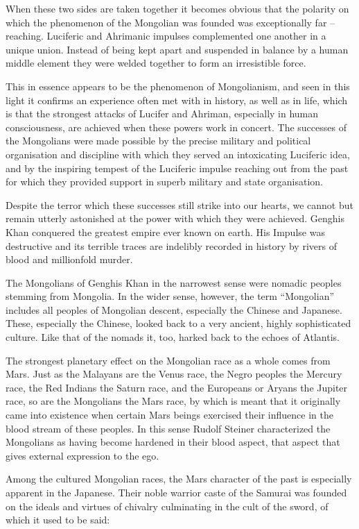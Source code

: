 When these two sides are taken together it becomes obvious that the polarity on which the phenomenon of the Mongolian was founded was exceptionally far -- reaching. Luciferic and Ahrimanic impulses complemented one another in a unique union. Instead of being kept apart and suspended in balance by a human middle element they were welded together to form an irresistible force.

This in essence appears to be the phenomenon of Mongolianism, and seen in this light it confirms an experience often met with in history, as well as in life, which is that the strongest attacks of Lucifer and Ahriman, especially in human consciousness, are achieved when these powers work in concert. The successes of the Mongolians were made possible by the precise military and political organisation and discipline with which they served an intoxicating Luciferic idea, and by the inspiring tempest of the Luciferic impulse reaching out from the past for which they provided support in superb military and state organisation.

Despite the terror which these successes still strike into our hearts, we cannot but remain utterly astonished at the power with which they were achieved. Genghis Khan conquered the greatest empire ever known on earth. His Impulse was destructive and its terrible traces are indelibly recorded in history by rivers of blood and millionfold murder.

The Mongolians of Genghis Khan in the narrowest sense were nomadic peoples stemming from Mongolia. In the wider sense, however, the term ``Mongolian'' includes all peoples of Mongolian descent, especially the Chinese and Japanese. These, especially the Chinese, looked back to a very ancient, highly sophisticated culture. Like that of the nomads it, too, harked back to the echoes of Atlantis.

The strongest planetary effect on the Mongolian race as a whole comes from Mars. Just as the Malayans are the Venus race, the Negro peoples the Mercury race, the Red Indians the Saturn race, and the Europeans or Aryans the Jupiter race, so are the Mongolians the Mars race, by which is meant that it originally came into existence when certain Mars beings exercised their influence in the blood stream of these peoples. In this sense Rudolf Steiner characterized the Mongolians as having become hardened in their blood aspect, that aspect that gives external expression to the ego.

Among the cultured Mongolian races, the Mars character of the past is especially apparent in the Japanese. Their noble warrior caste of the Samurai was founded on the ideals and virtues of chivalry culminating in the cult of the sword, of which it used to be said:

